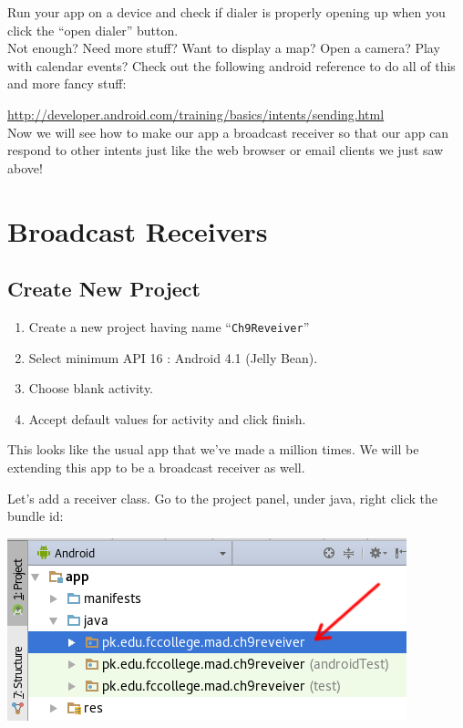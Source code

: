 Run your app on a device and check if dialer is properly opening up when you click the ``open dialer'' button. \\

Not enough? Need more stuff? Want to display a map? Open a camera? Play with calendar events? Check out the following android reference to do all of this and more fancy stuff:

\url{http://developer.android.com/training/basics/intents/sending.html} \\

Now we will see how to make our app a broadcast receiver so that our app can respond to other intents just like the web browser or email clients we just saw above!

\section{Broadcast Receivers}

\subsection{Create New Project}
\begin{enumerate}
	\item Create a new project having name ``\texttt{Ch9Reveiver}''
	\item Select minimum API 16 : Android 4.1 (Jelly Bean).
	\item Choose blank activity.
	\item Accept default values for activity and click finish. \\
\end{enumerate}

This looks like the usual app that we've made a million times. We will be extending this app to be a broadcast receiver as well. 

Let's add a receiver class. Go to the project panel, under java, right click the bundle id: 

\begin{center}
	\includegraphics[scale=0.4]{chapters/ch09/images/30}
\end{center}

